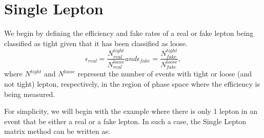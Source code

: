 

\section{Single Lepton}

We begin by defining the efficiency and fake rates of a real or fake lepton being classified as tight
given that it has been classified as loose.
\begin{equation}
  \label{eqn:efficiency_fake_rate}
  \epsilon_{real} = \frac{N^{tight}_{real}}{N^{loose}_{real}} and \epsilon_{fake} = \frac{N^{tight}_{fake}}{N^{loose}_{fake}},
\end{equation}
where $N^{tight}$ and $N^{loose}$ represent the number of events with tight or loose (and not tight) lepton, respectively, in the region of phase space where the efficiency is being measured.


For simplicity, we will begin with the example where there is only 1 lepton in an event that be either a real or a fake lepton.
In such a case, the Single Lepton matrix method can be written as:


